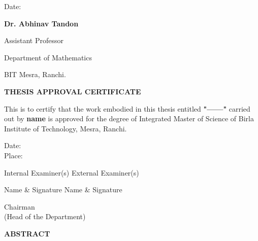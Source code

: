 \documentclass[12pt,a4wide]{report}
\numberwithin{equation}{chapter}
\numberwithin{theorem}{chapter}
\begin{document}
\vspace{4cm}

\noindent Date: 

\hfill \textbf{Dr. Abhinav Tandon}

\hfill Assistant Professor

\hfill Department of Mathematics

\hfill BIT Mesra, Ranchi.

\clearpage

\begin{center}
\end{center}

{
\color{blue}
\begin{center}
	{\Large{\bf{THESIS APPROVAL CERTIFICATE}}}
\end{center}
\noindent
This is to certify that the work embodied in this thesis entitled \textbf{"------"} carried out by \textbf{name} is approved for the degree of Integrated Master of Science of Birla Institute of Technology, Mesra, Ranchi.  
\vspace{0.5cm}

\noindent Date: \\
\noindent Place:

\vspace{2cm}

\noindent Internal Examiner(s)  \hfill External Examiner(s)  

\noindent Name \& Signature    \hfill Name \& Signature

\vspace{2cm}

\begin{center}
	Chairman\\
	(Head of the Department)
\end{center}
}

\clearpage
\begin{center}
{\Large{\bf{ABSTRACT}}}
\end{center}
\end{document}
